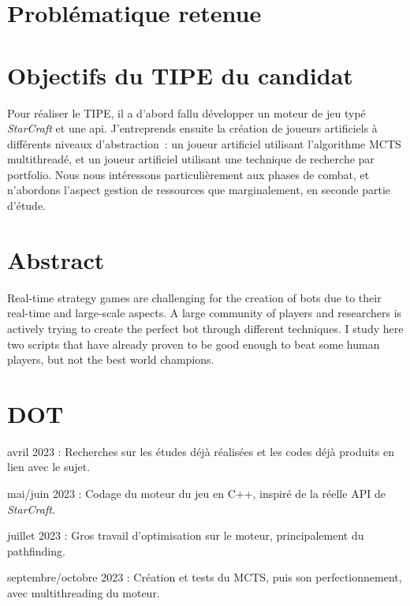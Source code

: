 \documentclass[a4paper, 11pt]{article}
\begin{document}
\section*{Problématique retenue}


\section*{Objectifs du TIPE du candidat}
Pour réaliser le TIPE, il a d'abord fallu développer un moteur de jeu typé \emph{StarCraft} et une api.
J'entreprends ensuite la création de joueurs artificiels à différents niveaux d'abstraction :
un joueur artificiel utilisant l'algorithme MCTS multithreadé, et un joueur artificiel utilisant une technique de recherche par portfolio.
Nous nous intéressons particulièrement aux phases de combat, et n'abordons l'aspect gestion de ressources que marginalement, en seconde partie d'étude.

\section*{Abstract}

Real-time strategy games are challenging for the creation of bots due to their real-time and large-scale aspects.
A large community of players and researchers is actively trying to create the perfect bot through different techniques.
I study here two scripts that have already proven to be good enough to beat some human players, but not the best world champions.



\nocite{*}


\section*{DOT}
\begin{enumerate}[{[1]}]
    \item avril 2023 : Recherches sur les études déjà réalisées et les codes déjà produits en lien avec le sujet.
    \item mai/juin 2023 : Codage du moteur du jeu en C++, inspiré de la réelle API de \emph{StarCraft}.
    \item juillet 2023 : Gros travail d'optimisation sur le moteur, principalement du pathfinding.
    \item septembre/octobre 2023 : Création et tests du MCTS, puis son perfectionnement, avec multithreading du moteur.
\end{enumerate}
\end{document}

